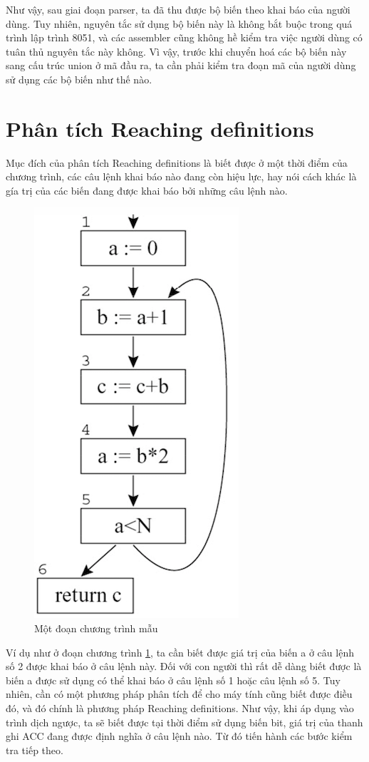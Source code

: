 Như vậy, sau giai đoạn parser, ta đã thu được bộ biến theo khai báo của người dùng. Tuy nhiên, nguyên tắc sử dụng bộ biến này là không bắt buộc trong quá trình lập trình 8051, và các assembler cũng không hề kiểm tra việc người dùng có tuân thủ nguyên tắc này không. Vì vậy, trước khi chuyển hoá các bộ biến này sang cấu trúc union ở mã đầu ra, ta cần phải kiểm tra đoạn mã của người dùng sử dụng các bộ biến như thế nào.

\section{Phân tích Reaching definitions}

Mục đích của phân tích Reaching definitions là biết được ở một thời điểm của chương trình, các câu lệnh khai báo nào đang còn hiệu lực, hay nói cách khác là gía trị của các biến đang được khai báo bởi những câu lệnh nào.
\begin{figure}
	\centering
	\includegraphics[scale=0.75]{image/reachingDefExam}
	\caption{Một đoạn chương trình mẫu}
	\label{fig:reachingdefexam}
\end{figure}
Ví dụ như ở đoạn chương trình \ref{fig:reachingdefexam}, ta cần biết được giá trị của biến a ở câu lệnh số 2 được khai báo ở câu lệnh này. Đối với con người thì rất dễ dàng biết được là biến a được sử dụng có thể khai báo ở câu lệnh số 1 hoặc câu lệnh số 5. Tuy nhiên, cần có một phương pháp phân tích để cho máy tính cũng biết được điều đó, và đó chính là phương pháp Reaching definitions. Như vậy, khi áp dụng vào trình dịch ngược, ta sẽ biết được tại thời điểm sử dụng biến bit, giá trị của thanh ghi ACC đang được định nghĩa ở câu lệnh nào. Từ đó tiến hành các bước kiểm tra tiếp theo. \\

